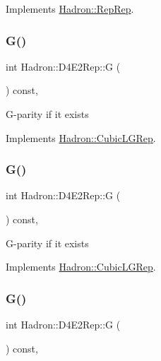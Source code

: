 Implements \mbox{\hyperlink{structHadron_1_1RepRep_a92c8802e5ed7afd7da43ccfd5b7cd92b}{Hadron\+::\+Rep\+Rep}}.

\mbox{\label{structHadron_1_1D4E2Rep_a841cd721b6c651b41ffb06fb8641c005}} 
\subsubsection{\texorpdfstring{G()}{G()}\hspace{0.1cm}{\footnotesize\ttfamily [1/3]}}
{\footnotesize\ttfamily int Hadron\+::\+D4\+E2\+Rep\+::G (\begin{DoxyParamCaption}{ }\end{DoxyParamCaption}) const\hspace{0.3cm}{\ttfamily [inline]}, {\ttfamily [virtual]}}

G-\/parity if it exists 

Implements \mbox{\hyperlink{structHadron_1_1CubicLGRep_ace26f7b2d55e3a668a14cb9026da5231}{Hadron\+::\+Cubic\+L\+G\+Rep}}.

\mbox{\label{structHadron_1_1D4E2Rep_a841cd721b6c651b41ffb06fb8641c005}} 
\subsubsection{\texorpdfstring{G()}{G()}\hspace{0.1cm}{\footnotesize\ttfamily [2/3]}}
{\footnotesize\ttfamily int Hadron\+::\+D4\+E2\+Rep\+::G (\begin{DoxyParamCaption}{ }\end{DoxyParamCaption}) const\hspace{0.3cm}{\ttfamily [inline]}, {\ttfamily [virtual]}}

G-\/parity if it exists 

Implements \mbox{\hyperlink{structHadron_1_1CubicLGRep_ace26f7b2d55e3a668a14cb9026da5231}{Hadron\+::\+Cubic\+L\+G\+Rep}}.

\mbox{\label{structHadron_1_1D4E2Rep_a841cd721b6c651b41ffb06fb8641c005}} 
\subsubsection{\texorpdfstring{G()}{G()}\hspace{0.1cm}{\footnotesize\ttfamily [3/3]}}
{\footnotesize\ttfamily int Hadron\+::\+D4\+E2\+Rep\+::G (\begin{DoxyParamCaption}{ }\end{DoxyParamCaption}) const\hspace{0.3cm}{\ttfamily [inline]}, {\ttfamily [virtual]}}

